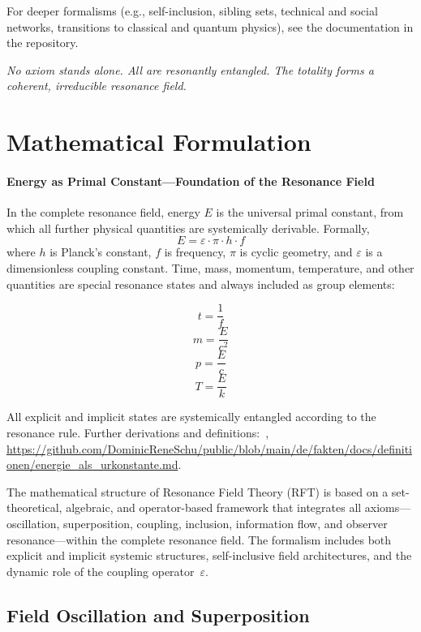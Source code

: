 \documentclass[12pt]{iopart}
\begin{document}
\bigskip

For deeper formalisms (e.g., self-inclusion, sibling sets, technical and social networks, transitions to classical and quantum physics), see the documentation in the repository.

\bigskip

\textit{No axiom stands alone. All are resonantly entangled. The totality forms a coherent, irreducible resonance field.}

\section{Mathematical Formulation}

\paragraph{Energy as Primal Constant—Foundation of the Resonance Field}
In the complete resonance field, energy $E$ is the universal primal constant, from which all further physical quantities are systemically derivable. Formally,
\[
E = \varepsilon \cdot \pi \cdot h \cdot f
\]
where $h$ is Planck’s constant, $f$ is frequency, $\pi$ is cyclic geometry, and $\varepsilon$ is a dimensionless coupling constant. Time, mass, momentum, temperature, and other quantities are special resonance states and always included as group elements:

\[
t = \frac{1}{f}
\]
\[
m = \frac{E}{c^2}
\]
\[
p = \frac{E}{c}
\]
\[
T = \frac{E}{k}
\]

All explicit and implicit states are systemically entangled according to the resonance rule. Further derivations and definitions:~\cite{rftrepo}, \url{https://github.com/DominicReneSchu/public/blob/main/de/fakten/docs/definitionen/energie_als_urkonstante.md}.

\vspace{1em}

The mathematical structure of Resonance Field Theory (RFT) is based on a set-theoretical, algebraic, and operator-based framework that integrates all axioms—oscillation, superposition, coupling, inclusion, information flow, and observer resonance—within the complete resonance field. The formalism includes both explicit and implicit systemic structures, self-inclusive field architectures, and the dynamic role of the coupling operator~$\varepsilon$.

\subsection{Field Oscillation and Superposition}
\end{document}
